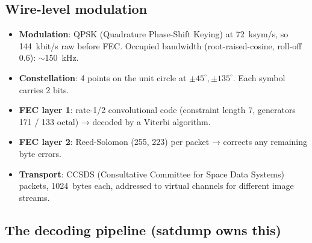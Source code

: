\documentclass[11pt,a4paper]{article}
\begin{document}
\subsection{Wire-level modulation}

\begin{itemize}
  \item \textbf{Modulation}: QPSK (Quadrature Phase-Shift Keying) at
        \SI{72}{ksym/s}, so \SI{144}{kbit/s} raw before FEC.
        Occupied bandwidth (root-raised-cosine, roll-off 0.6):
        \(\sim\)\SI{150}{kHz}.
  \item \textbf{Constellation}: 4 points on the unit circle at
        \(\pm 45^\circ, \pm 135^\circ\).  Each symbol carries 2 bits.
  \item \textbf{FEC layer 1}: rate-1/2 convolutional code (constraint
        length 7, generators 171 / 133 octal) → decoded by a Viterbi
        algorithm.
  \item \textbf{FEC layer 2}: Reed-Solomon (255, 223) per packet →
        corrects any remaining byte errors.
  \item \textbf{Transport}: CCSDS (Consultative Committee for Space
        Data Systems) packets, \SI{1024}{bytes} each, addressed to
        virtual channels for different image streams.
\end{itemize}

\begin{center}
\end{center}

\subsection{The decoding pipeline (satdump owns this)}
\end{document}
